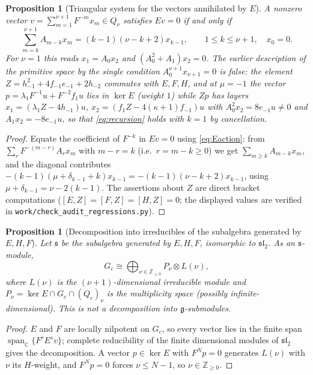 \documentclass[11pt,a4paper]{article}
\newcommand{\C}{\mathbb C}
\newcommand{\Z}{\mathbb Z}
\newcommand{\g}{\mathfrak g}
\newcommand{\slc}{\mathfrak{sl}_2}
\newcommand{\Span}{\operatorname{span}_{\C}}
\newtheorem{proposition}[theorem]{Proposition}
\begin{document}
\begin{proposition}[Triangular system for the vectors annihilated by $E$]
\label{prop:recursion}
A nonzero vector $v=\sum_{m=1}^{\nu+1}F^{-m}x_m\in Q_\nu$ satisfies
$Ev=0$ if and only if
\begin{equation}\label{eq:recursion}
 \sum_{m=k}^{\nu+1}A_{m-k}x_m=(k-1)(\nu-k+2)x_{k-1},
 \qquad 1\le k\le\nu+1,\quad x_0=0.
\end{equation}
For $\nu=1$ this reads $x_1=A_0x_2$ and $(A_0^2+A_1)x_2=0$. The earlier
description of the primitive space by the single condition
$A_0^{\nu+1}x_{\nu+1}=0$ is false: the element
$Z=h_{-1}^2+4f_{-1}e_{-1}+2h_{-2}$ commutes with $E,F,H$, and at
$\mu=-1$ the vector $p=\lambda_1F^{-1}u+F^{-2}f_1u$ lies in $\ker E$
(weight $1$) while $Zp$ has layers $x_1=(\lambda_1Z-4h_{-1})u$,
$x_2=(f_1Z-4(\kappa+1)f_{-1})u$ with $A_0^2x_2=8e_{-1}u\ne0$ and
$A_1x_2=-8e_{-1}u$, so that \eqref{eq:recursion} holds with $k=1$ by
cancellation.
\end{proposition}
\begin{proof}
Equate the coefficient of $F^{-k}$ in $Ev=0$ using \eqref{eq:Eaction}:
from $\sum_rF^{-(m-r)}A_rx_m$ with $m-r=k$ (i.e.\ $r=m-k\ge0$) we get
$\sum_{m\ge k}A_{m-k}x_m$, and the diagonal contributes
$-(k-1)(\mu+\delta_{k-1}+k)x_{k-1}=-(k-1)(\nu-k+2)x_{k-1}$, using
$\mu+\delta_{k-1}=\nu-2(k-1)$. The assertions about $Z$ are direct
bracket computations ($[E,Z]=[F,Z]=[H,Z]=0$; the displayed values are
verified in \texttt{work/check\_audit\_regressions.py}).
\end{proof}

\begin{proposition}[Decomposition into irreducibles of the subalgebra generated by $E,H,F$]
\label{prop:sl2}
Let $\mathfrak s$ be the subalgebra generated by $E,H,F$, isomorphic to
$\slc$. As an $\mathfrak s$-module,
\[
 G_c\cong\bigoplus_{\nu\in\Z_{\ge0}}P_\nu\otimes L(\nu),
\]
where $L(\nu)$ is the $(\nu+1)$-dimensional irreducible module and
$P_\nu=\ker E\cap G_c\cap(Q_c)_\nu$ is the multiplicity space (possibly
infinite-dimensional). This is not a decomposition into
$\g$-submodules.
\end{proposition}
\begin{proof}
$E$ and $F$ are locally nilpotent on $G_c$, so every vector lies in the
finite span $\Span\{F^rE^sv\}$; complete reducibility of the finite
dimensional modules of $\slc$ gives the decomposition. A vector
$p\in\ker E$ with $F^Np=0$ generates $L(\nu)$ with $\nu$ its $H$-weight,
and $F^Np=0$ forces $\nu\le N-1$, so $\nu\in\Z_{\ge0}$.
\end{proof}
\end{document}
